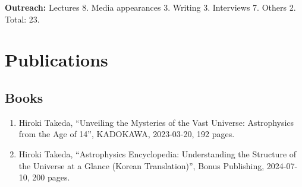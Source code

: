 \documentclass[uplatex, 12pt]{article}
\begin{document}
\noindent 
\textbf{Outreach:} Lectures 8. Media appearances 3. Writing 3. Interviews 7. Others 2.\\
\hspace{2.75cm}Total: 23. \\


\section*{Publications}
\subsection*{Books}
\begin{enumerate}
\item Hiroki Takeda, “Unveiling the Mysteries of the Vast Universe: Astrophysics from the Age of 14”, KADOKAWA, 2023-03-20, 192 pages.
\item Hiroki Takeda, “Astrophysics Encyclopedia: Understanding the Structure of the Universe at a Glance (Korean Translation)”, Bonus Publishing, 2024-07-10, 200 pages.
\end{enumerate}
\end{document}

